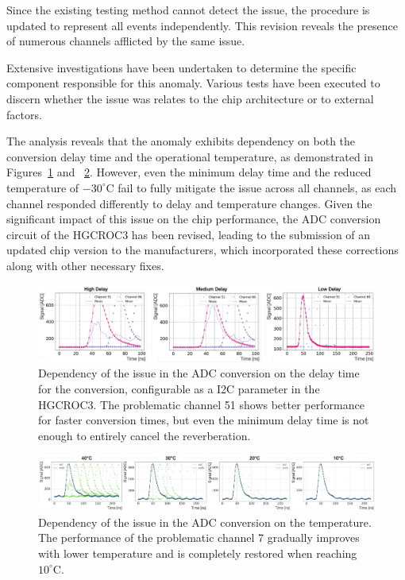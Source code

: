 Since the existing testing method cannot detect the issue, the procedure is updated to represent all events independently. This revision reveals the presence of numerous channels afflicted by the same issue.

\bigbreak

Extensive investigations have been undertaken to determine the specific component responsible for this anomaly. Various tests have been executed to discern whether the issue was relates to the chip architecture or to external factors.

The analysis reveals that the anomaly exhibits dependency on both the conversion delay time and the operational temperature, as demonstrated in Figures~\ref{fig:ADCIssue_Delay} and ~\ref{fig:ADCIssue_Temperature}. However, even the minimum delay time and the reduced temperature of $-30^\circ$C fail to fully mitigate the issue across all channels, as each channel responded differently to delay and temperature changes. Given the significant impact of this issue on the chip performance, the ADC conversion circuit of the HGCROC3 has been revised, leading to the submission of an updated chip version to the manufacturers, which incorporated these corrections along with other necessary fixes.

\begin{figure}
    \centering
    \includegraphics[width=0.99\linewidth]{Figures/HGCAL/ADCIssue_Delay.pdf}
    \caption{Dependency of the issue in the ADC conversion on the delay time for the conversion, configurable as a I2C parameter in the HGCROC3. The problematic channel 51 shows better performance for faster conversion times, but even the minimum delay time is not enough to entirely cancel the reverberation.}
    \label{fig:ADCIssue_Delay}
\end{figure}

\begin{figure}
    \centering
    \includegraphics[width=0.99\linewidth]{Figures/HGCAL/ADCIssue_Temperature.pdf}
    \caption{Dependency of the issue in the ADC conversion on the temperature. The performance of the problematic channel 7 gradually improves with lower temperature and is completely restored when reaching $10^{\circ}$C.}
    \label{fig:ADCIssue_Temperature}
\end{figure}

